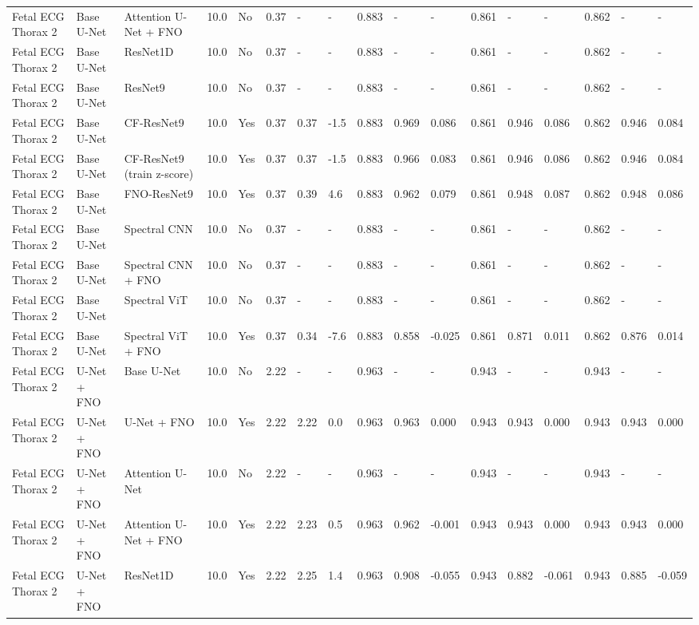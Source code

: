 \begin{longtable}{lllllllllllllllll}
Fetal ECG Thorax 2 & Base U-Net & Attention U-Net + FNO & 10.0 & No & 0.37 & - & - & 0.883 & - & - & 0.861 & - & - & 0.862 & - & - \\
Fetal ECG Thorax 2 & Base U-Net & ResNet1D & 10.0 & No & 0.37 & - & - & 0.883 & - & - & 0.861 & - & - & 0.862 & - & - \\
Fetal ECG Thorax 2 & Base U-Net & ResNet9 & 10.0 & No & 0.37 & - & - & 0.883 & - & - & 0.861 & - & - & 0.862 & - & - \\
Fetal ECG Thorax 2 & Base U-Net & CF-ResNet9 & 10.0 & Yes & 0.37 & 0.37 & -1.5 & 0.883 & 0.969 & 0.086 & 0.861 & 0.946 & 0.086 & 0.862 & 0.946 & 0.084 \\
Fetal ECG Thorax 2 & Base U-Net & CF-ResNet9 (train z-score) & 10.0 & Yes & 0.37 & 0.37 & -1.5 & 0.883 & 0.966 & 0.083 & 0.861 & 0.946 & 0.086 & 0.862 & 0.946 & 0.084 \\
Fetal ECG Thorax 2 & Base U-Net & FNO-ResNet9 & 10.0 & Yes & 0.37 & 0.39 & 4.6 & 0.883 & 0.962 & 0.079 & 0.861 & 0.948 & 0.087 & 0.862 & 0.948 & 0.086 \\
Fetal ECG Thorax 2 & Base U-Net & Spectral CNN & 10.0 & No & 0.37 & - & - & 0.883 & - & - & 0.861 & - & - & 0.862 & - & - \\
Fetal ECG Thorax 2 & Base U-Net & Spectral CNN + FNO & 10.0 & No & 0.37 & - & - & 0.883 & - & - & 0.861 & - & - & 0.862 & - & - \\
Fetal ECG Thorax 2 & Base U-Net & Spectral ViT & 10.0 & No & 0.37 & - & - & 0.883 & - & - & 0.861 & - & - & 0.862 & - & - \\
Fetal ECG Thorax 2 & Base U-Net & Spectral ViT + FNO & 10.0 & Yes & 0.37 & 0.34 & -7.6 & 0.883 & 0.858 & -0.025 & 0.861 & 0.871 & 0.011 & 0.862 & 0.876 & 0.014 \\
Fetal ECG Thorax 2 & U-Net + FNO & Base U-Net & 10.0 & No & 2.22 & - & - & 0.963 & - & - & 0.943 & - & - & 0.943 & - & - \\
Fetal ECG Thorax 2 & U-Net + FNO & U-Net + FNO & 10.0 & Yes & 2.22 & 2.22 & 0.0 & 0.963 & 0.963 & 0.000 & 0.943 & 0.943 & 0.000 & 0.943 & 0.943 & 0.000 \\
Fetal ECG Thorax 2 & U-Net + FNO & Attention U-Net & 10.0 & No & 2.22 & - & - & 0.963 & - & - & 0.943 & - & - & 0.943 & - & - \\
Fetal ECG Thorax 2 & U-Net + FNO & Attention U-Net + FNO & 10.0 & Yes & 2.22 & 2.23 & 0.5 & 0.963 & 0.962 & -0.001 & 0.943 & 0.943 & 0.000 & 0.943 & 0.943 & 0.000 \\
Fetal ECG Thorax 2 & U-Net + FNO & ResNet1D & 10.0 & Yes & 2.22 & 2.25 & 1.4 & 0.963 & 0.908 & -0.055 & 0.943 & 0.882 & -0.061 & 0.943 & 0.885 & -0.059 \\

\end{longtable}
